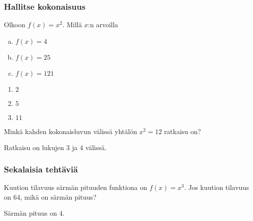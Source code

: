 \subsubsection*{Hallitse kokonaisuus}

\begin{tehtava}
Olkoon $f(x)=x^2$. Millä $x$:n arvoilla
\begin{enumerate}[a)]
\item $f(x)=4$
\item $f(x)=25$
\item $f(x)=121$
\end{enumerate}
\begin{vastaus}
\begin{enumerate}
\item $2$
\item $5$
\item $11$
\end{enumerate}
\end{vastaus}

\end{tehtava}
\begin{tehtava}
Minkä kahden kokonaisluvun välissä yhtälön $x^2 = 12$ ratkaisu on?
\begin{vastaus}
Ratkaisu on lukujen $3$ ja $4$ välissä.
\end{vastaus}
\end{tehtava}

\subsubsection*{Sekalaisia tehtäviä}

\begin{tehtava}
Kuution tilavuus särmän pituuden funktiona on $f(x) = x^3$. Jos kuution tilavuus on $64$, mikä on särmän pituus?
\begin{vastaus}
Särmän pituus on $4$.
\end{vastaus}
\end{tehtava}
